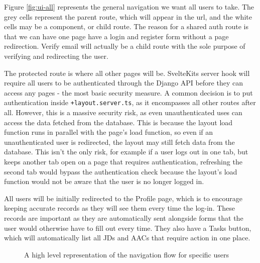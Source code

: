 Figure \ref{fig:ui-all} represents the general navigation we want all users to take. The grey cells represent the parent route, which will appear in the url, and the white cells may be a component, or child route. The reason for a shared auth route is that we can have one page have a login and register form without a page redirection. Verify email will actually be a child route with the sole purpose of verifying and redirecting the user. 

The protected route is where all other pages will be. SvelteKits server hook will require all users to be authenticated through the Django API before they can access any pages - the most basic security measure. A common decision is to put authentication inside \texttt{+layout.server.ts}, as it encompasses all other routes after all. However, this is a massive security risk, as even unauthenticated uses can access the data fetched from the database. This is because the layout load function runs in parallel with the page's load function, so even if an unauthenticated user is redirected, the layout may still fetch data from the database. This isn't the only risk, for example if a user logs out in one tab, but keeps another tab open on a page that requires authentication, refreshing the second tab would bypass the authentication check because the layout's load function would not be aware that the user is no longer logged in.

All users will be initially redirected to the Profile page, which is to encourage keeping accurate records as they will see them every time the log-in. These records are important as they are automatically sent alongside forms that the user would otherwise have to fill out every time. They also have a Tasks button, which will automatically list all JDs and AACs that require action in one place.

\begin{figure}[h]
\centering
{}
\vspace{-5pt}
\caption{A high level representation of the navigation flow for specific users}
\label{fig:ui-role}
\vspace{-5pt}
\end{figure}


